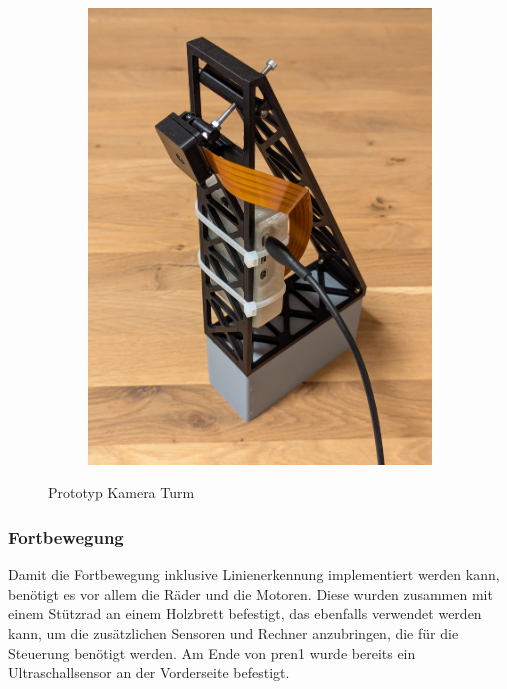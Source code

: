 \begin{figure}[H]
\begin{subfigure}{0.4\textwidth}
\includegraphics[width=0.95\linewidth]{assets/informatik-prototyp/camer_tower_2.png} 
\end{subfigure}
\caption{Prototyp Kamera Turm}
\label{fig:prototype-camera-tower}
\end{figure}

\subsubsection*{Fortbewegung}

Damit die Fortbewegung inklusive Linienerkennung implementiert werden kann, benötigt es vor allem die Räder und die Motoren. Diese wurden zusammen mit einem Stützrad an einem Holzbrett befestigt, das ebenfalls verwendet werden kann, um die zusätzlichen Sensoren und Rechner anzubringen, die für die Steuerung benötigt werden. Am Ende von \acrshort{pren1} wurde bereits ein Ultraschallsensor an der Vorderseite befestigt.

